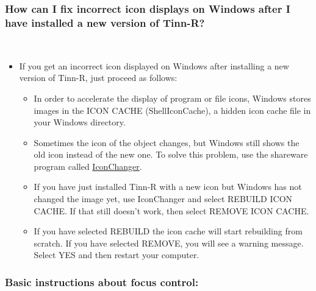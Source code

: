 \subsubsection{How can I fix incorrect icon displays on Windows after I have installed a new version of Tinn-R?}\\

\begin{itemize}
  \item If you get an incorrect icon displayed on Windows after
    installing a new version of Tinn-R, just proceed as follows:
    \begin{itemize}
      \item In order to accelerate the display of program or file
        icons, Windows stores images in the ICON CACHE (ShellIconCache),
        a hidden icon cache file in your Windows directory.
      \item Sometimes the icon of the object changes, but Windows still
        shows the old icon instead of the new one. To solve this
        problem, use the shareware program called
        \href{http://www.shelllabs.com/}{IconChanger}.
      \item If you have just installed Tinn-R with a new icon but Windows
        has not changed the image yet, use IconChanger and select REBUILD
        ICON CACHE.  If that still doesn't work, then select REMOVE ICON CACHE.
      \item If you have selected REBUILD the icon cache will start rebuilding
        from scratch. If you have selected REMOVE, you will see a warning
        message. Select YES and then restart your computer.
    \end{itemize}
\end{itemize}


\subsubsection{Basic instructions about focus control:}\\

